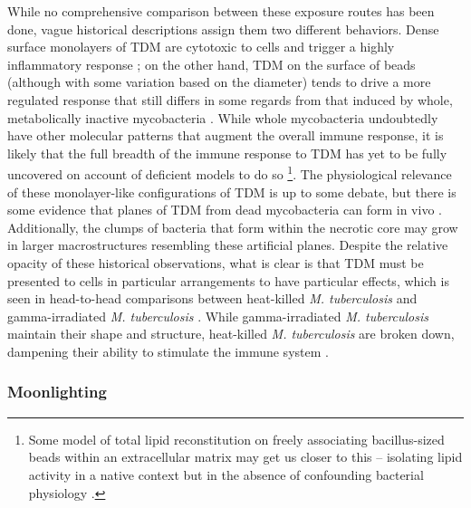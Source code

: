 While no comprehensive comparison between these exposure routes has been done, vague historical descriptions assign them two different behaviors. Dense surface monolayers of TDM are cytotoxic to cells and trigger a highly inflammatory response \citep{Retzinger1982, Schabbing1994, Hunter2006a, Welsh2013}; on the other hand, TDM on the surface of beads (although with some variation based on the diameter) tends to drive a more regulated response that still differs in some regards from that induced by whole, metabolically inactive mycobacteria \citep{Bowdish2009, Welsh2013}. While whole mycobacteria undoubtedly have other molecular patterns that augment the overall immune response, it is likely that the full breadth of the immune response to TDM has yet to be fully uncovered on account of deficient models to do so \footnote{Some model of total lipid reconstitution on freely associating bacillus\hyp{}sized beads within an extracellular matrix may get us closer to this -- isolating lipid activity in a native context but in the absence of confounding bacterial physiology \citep{Rhoades2003, Retzinger1982, Sakamoto2010}.}. The physiological relevance of these monolayer\hyp{}like configurations of TDM is up to some debate, but there is some evidence that planes of TDM from dead mycobacteria can form in vivo \citep{Hunter2006b, Glickman2008, Schabbing1994}. Additionally, the clumps of bacteria that form within the necrotic core may grow in larger macrostructures resembling these artificial planes. Despite the relative opacity of these historical observations, what is clear is that TDM must be presented to cells in particular arrangements to have particular effects, which is seen in head\hyp{}to\hyp{}head comparisons between heat\hyp{}killed \textit{M. tuberculosis} and gamma\hyp{}irradiated \textit{M. tuberculosis} \citep{Mosavari2021, Cha2015, Yang2018, Gleeson2016, Datta2006, Krokowski2018}. While gamma\hyp{}irradiated \textit{M. tuberculosis} maintain their shape and structure, heat\hyp{}killed \textit{M. tuberculosis} are broken down, dampening their ability to stimulate the immune system \citep{SecanellaFandos2014, Carpenter1959}. 

\subsubsection{Moonlighting}\label{moon}

